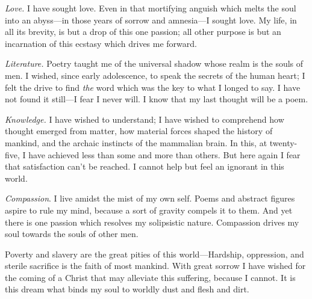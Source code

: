 \documentclass[a4paper, 12pt]{article}
\begin{document}
    
\textit{Love.} I have sought love. Even in that mortifying anguish which
melts the soul into an abyss—in those years of sorrow and amnesia—I sought
love. My life, in all its brevity, is but a drop of this one passion; all other
purpose is but an incarnation of this ecstasy which drives me forward.

\textit{Literature.} Poetry taught me of the universal shadow whose realm is
the souls of men. I wished, since early adolescence, to speak the secrets of
the human heart; I felt the drive to find \textit{the} word which was the key
to what I longed to say. I have not found it still---I fear I never will. I
know that my last thought will be a poem.

\textit{Knowledge.} I have wished to understand; I have wished to comprehend how
thought emerged from matter, how material forces shaped the history of mankind,
and the archaic instincts of the mammalian brain. In this, at twenty-five, I
have achieved less than some and more than others. But here again I fear 
that satisfaction can't be reached. I cannot help but feel an ignorant in this
world.

\textit{Compassion}. I live amidst the mist of my own self. Poems and abstract
figures aspire to rule my mind, because a sort of gravity compels it to them.
And yet there is one passion which resolves my solipsistic nature. Compassion
drives my soul towards the souls of other men. 

Poverty and slavery are the great pities of this world—Hardship, oppression,
and sterile sacrifice is the faith of most mankind. With great sorrow I have
wished for the coming of a Christ that may alleviate this suffering, because I
cannot. It is this dream what binds my soul to worldly dust and flesh and dirt.
\end{document}
